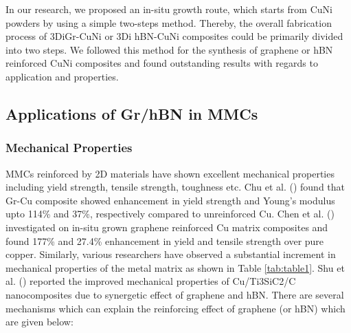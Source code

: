In our research, we proposed an in-situ growth route, which starts from CuNi powders by using a simple two-steps method. Thereby, the overall fabrication process of 3DiGr-CuNi or 3Di hBN-CuNi composites could be primarily divided into two steps. We followed this method for the synthesis of graphene or hBN reinforced CuNi composites and found outstanding results with regards to application and properties.

\subsection{Applications of Gr/hBN in MMCs}

\subsubsection{Mechanical Properties}

MMCs reinforced by 2D materials have shown excellent mechanical properties including yield strength, tensile strength, toughness etc. Chu et al. (\cite{chu2014enhanced}) found that Gr-Cu composite showed enhancement in yield strength and Young’s modulus upto 114\% and 37\%, respectively compared to unreinforced Cu. Chen et al. (\cite{chen2016fabrication}) investigated on in-situ grown graphene reinforced Cu matrix composites and found 177\% and 27.4\% enhancement in yield and tensile strength over pure copper. Similarly, various researchers have observed a substantial increment in mechanical properties of the metal matrix as shown in Table \ref{tab:table1}. Shu et al. (\cite{shu2019synergetic}) reported the improved mechanical properties of Cu/Ti3SiC2/C nanocomposites due to synergetic effect of graphene and hBN. There are several mechanisms which can explain the reinforcing effect of graphene (or hBN) which are given below:


